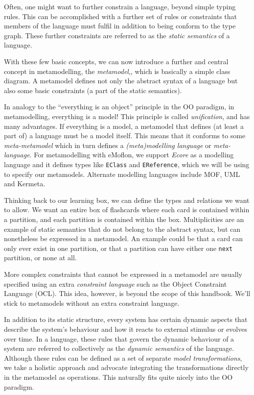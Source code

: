 Often, one might want to further constrain a language, beyond simple typing rules. This can be accomplished with a further set of rules or constraints that
members of the language must fulfil in addition to being conform to the type graph. These further constraints are referred to as the
\emph{static semantics} of a language.

With these few basic concepts, we can now introduce a further and central concept in metamodelling, the \emph{metamodel},, which is basically a simple class diagram.
A metamodel defines not only the abstract syntax of a language but also some basic constraints (a part of the static semantics).

In analogy to the ``everything is an object'' principle in the OO paradigm, in metamodelling, everything is a model! This principle is called \emph{unification}, and has many
advantages. If everything is a model, a metamodel that defines (at least a part of) a language must be a model itself. This means that it conforms to some
\emph{meta-metamodel} which in turn defines a \emph{(meta)modelling language} or \emph{meta-language}. For
metamodelling with eMoflon, we support \emph{Ecore} as a modelling language and it defines types like \texttt{EClass} and \texttt{EReference}, which we will be using to specify  our metamodels. Alternate modelling languages include MOF,
UML and Kermeta.

Thinking back to our learning box, we can define the types and relations we want to allow. We want an entire box of flashcards where each card is contained
within a partition, and each partition is contained within the box. Multiplicities are an example of static semantics that do not belong to the abstract
syntax, but can nonetheless be expressed in a metamodel. An example could be that a card can only ever exist in one partition, or that a partition can have
either one \texttt{next} partition, or none at all.

More complex constraints that cannot be expressed in a metamodel are usually specified using an extra \emph{constraint language}
such as the Object Constraint Language (OCL). This idea, however,  is beyond the scope of this handbook. We'll stick to metamodels without an extra
constraint language.

In addition to its static structure, every system has certain dynamic aspects that describe the system's behaviour and how it reacts to external stimulus or
evolves over time. In a language, these rules that govern the dynamic behaviour of a system are referred to collectively as the
\emph{dynamic semantics} of the language. Although these rules can be defined as a set of separate \emph{model transformations}, we
take a holistic approach and advocate integrating the transformations directly in the metamodel as operations. This naturally fits quite nicely into the OO
paradigm.

